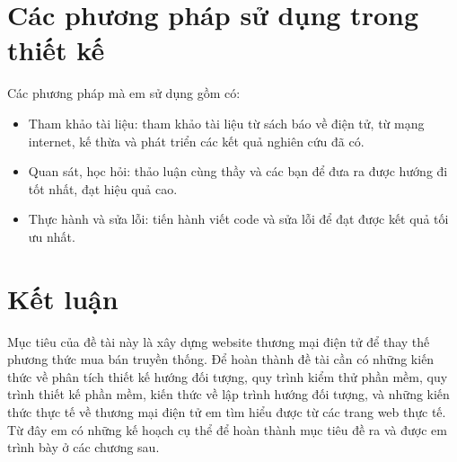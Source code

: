 \section{Các phương pháp sử dụng trong thiết kế}
Các phương pháp mà em sử dụng gồm có:
\begin{itemize}
\item   Tham khảo tài liệu: tham khảo tài liệu từ sách báo về điện tử, từ mạng internet, kế thừa và phát triển các kết quả nghiên cứu đã có.
\item   Quan sát, học hỏi: thảo luận cùng thầy và các bạn để đưa ra được hướng đi tốt nhất, đạt hiệu quả cao.
\item   Thực hành và sửa lỗi: tiến hành viết code và sửa lỗi để đạt được kết quả tối ưu nhất.
\end{itemize}\par
\section{Kết luận}
Mục tiêu của đề tài này là xây dựng website thương mại điện tử để thay thế phương thức mua bán truyền thống. Để hoàn thành đề tài cần có  những kiến thức về phân tích thiết kế hướng đối tượng, quy trình kiểm thử phần mềm, quy trình thiết kế phần mềm, kiến thức về lập trình hướng đối tượng, và những kiến thức thực tế về thương mại điện tử em tìm hiểu được từ các trang web thực tế. Từ đây em có những kế hoạch cụ thể để hoàn thành mục tiêu đề ra và được em trình bày ở các chương sau.

